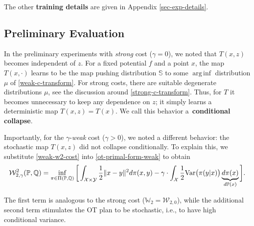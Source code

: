 \documentclass{article} %
\DeclareMathOperator*{\arginf}{arg\,inf}
\begin{document}
\vspace{-0.8mm}The other \textbf{training details} are given in Appendix \ref{sec-exp-details}.

\vspace{-1.7mm}\subsection{Preliminary Evaluation}
\label{sec-preliminary-experiments}

\vspace{-1.7mm}In the preliminary experiments with   \textit{strong} cost ($\gamma=0$), we noted that $T(x,z)$ becomes independent of $z$. For a fixed potential $f$ and a point $x$, the map $T(x,\cdot)$ learns to be the map pushing distribution $\mathbb{S}$ to some $\arginf$ distribution $\mu$ of \eqref{weak-c-transform}. For strong costs, there are suitable degenerate distributions $\mu$, see the discussion around \eqref{strong-c-transform}. Thus, for $T$ it becomes unnecessary to keep any dependence on $z$; it simply learns a deterministic map ${T(x,z)=T(x)}$. We call this behavior   a~\textbf{conditional collapse}.

Importantly, for the $\gamma$-\textit{weak} cost ($\gamma>0$), we noted a different behavior: the stochastic map $T(x,z)$ did not collapse conditionally.  To explain this, we substitute \eqref{weak-w2-cost} into \eqref{ot-primal-form-weak} to obtain\vspace{-0.5mm}
 \begin{eqnarray}\mathcal{W}_{2,\gamma}^{2}(\mathbb{P},\mathbb{Q})=\inf_{\pi\in\Pi(\mathbb{P},\mathbb{Q})}\bigg[\int_{\mathcal{X}\times\mathcal{Y}}\frac{1}{2}\|x-y\|^{2}d\pi(x,y)-
 \gamma\cdot \int_{\mathcal{X}} \frac{1}{2}\text{Var}\big(\pi(y\vert x)\big)\underbrace{d\pi(x)}_{d\mathbb{P}(x)}\bigg].
 \nonumber\vspace{-0.5mm}
 \end{eqnarray}
 
\vspace{-3mm}The first term is analogous to the strong cost ($\mathbb{W}_{2}=\mathcal{W}_{2,0}$), while the additional second term stimulates the OT plan to be stochastic, i.e., to have high conditional variance.
 
\end{document}
